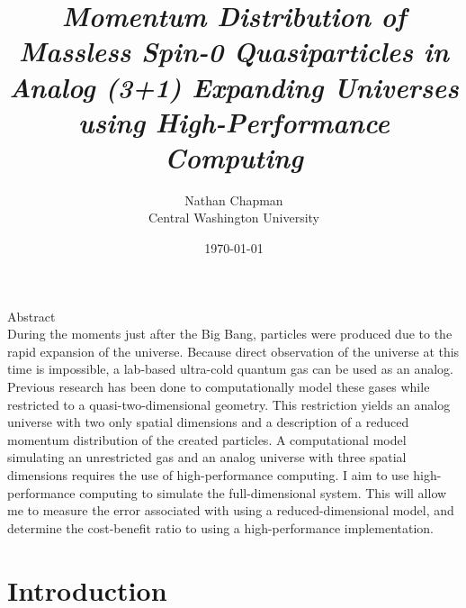 \documentclass{article}
\title{\Large \vspace{-0.625in} \emph{Momentum Distribution of Massless Spin-0 Quasiparticles in Analog (3+1) Expanding Universes using High-Performance Computing} \vspace{-0.15in}}
\author{Nathan Chapman \\ {\normalsize Central Washington University}}
\date{\vspace{-0.1in}\today}
\begin{document}
\maketitle

\begin{center}
    Abstract \\
    During the moments just after the Big Bang, particles were produced due to the rapid expansion of the universe. Because direct observation of the universe at this time is impossible, a lab-based ultra-cold quantum gas can be used as an analog.  Previous research has been done to computationally model these gases while restricted to a quasi-two-dimensional geometry.  This restriction yields an analog universe with two only spatial dimensions and a description of a reduced momentum distribution of the created particles.  A computational model simulating an unrestricted gas and an analog universe with three spatial dimensions requires the use of high-performance computing.  I aim to use high-performance computing to simulate the full-dimensional system. This will allow me to measure the error associated with using a reduced-dimensional model, and determine the cost-benefit ratio to using a high-performance implementation.
        
        
        
\end{center}

\tableofcontents

\pagebreak

\section{Introduction} \label{sec:intro}
\end{document}
